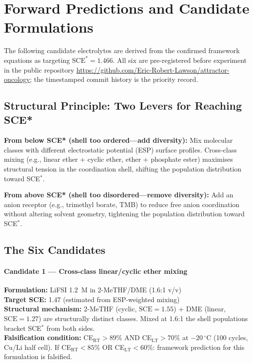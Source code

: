 \documentclass[11pt]{article}
\theoremstyle{plain}
\theoremstyle{definition}
\theoremstyle{remark}
\begin{document}
\section{Forward Predictions and Candidate Formulations}
\label{sec:candidates}

The following candidate electrolytes are derived from the confirmed framework
equations as targeting $\mathrm{SCE}^{*} = 1.466$.
All six are pre-registered before experiment in the public repository
\url{https://github.com/Eric-Robert-Lawson/attractor-oncology};
the timestamped commit history is the priority record.

\subsection{Structural Principle: Two Levers for Reaching SCE*}

\medskip\noindent\textbf{From below SCE* (shell too ordered---add diversity):}
Mix molecular classes with different electrostatic potential (ESP) surface profiles.
Cross-class mixing (e.g., linear ether + cyclic ether, ether + phosphate ester)
maximises structural tension in the coordination shell, shifting the population
distribution toward SCE$^{*}$.

\medskip\noindent\textbf{From above SCE* (shell too disordered---remove diversity):}
Add an anion receptor (e.g., trimethyl borate, TMB) to reduce free anion
coordination without altering solvent geometry, tightening the population
distribution toward SCE$^{*}$.

\subsection{The Six Candidates}

\paragraph{Candidate 1 --- Cross-class linear/cyclic ether mixing}
\textbf{Formulation:} LiFSI 1.2~M in 2-MeTHF/DME (1.6:1 v/v)\\
\textbf{Target SCE:} 1.47 (estimated from ESP-weighted mixing)\\
\textbf{Structural mechanism:} 2-MeTHF (cyclic, $\mathrm{SCE}=1.55$) +
DME (linear, $\mathrm{SCE}=1.27$) are structurally distinct classes.
Mixed at 1.6:1 the shell populations bracket SCE$^{*}$ from both sides.\\
\textbf{Falsification condition:} CE$_{\mathrm{RT}} > 89\%$ AND
CE$_{\mathrm{LT}} > 70\%$ at $-20\,^{\circ}$C (100 cycles, Cu/Li half cell).
If CE$_{\mathrm{RT}} < 85\%$ OR CE$_{\mathrm{LT}} < 60\%$: framework prediction
for this formulation is falsified.
\end{document}
